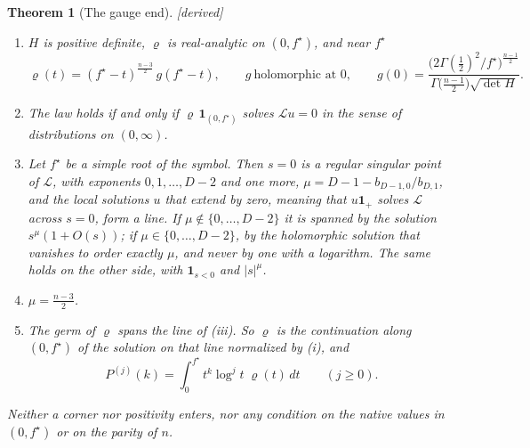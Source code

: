 \documentclass[11pt]{article}
\newcommand{\one}{\mathbf 1}
\theoremstyle{plain}
\newtheorem{theorem}[proposition]{Theorem}
\theoremstyle{definition}
\theoremstyle{remark}
\newcommand{\derived}{\textup{[derived]}}
\begin{document}
\begin{theorem}[The gauge end]\label{c:t:gauge}\label{d:t:gauge}\derived\
\begin{enumerate}[label=(\roman*)]
\item $H$ is positive definite, $\varrho$ is real-analytic on $(0,f^\star)$, and near $f^\star$
\[
\varrho(t)=(f^\star-t)^{\frac{n-3}2}\,g(f^\star-t),\qquad g\ \text{holomorphic at }0,\qquad g(0)=\frac{\big(2\Gamma(\frac12)^2/f^\star\big)^{\frac{n-1}2}}{\Gamma\big(\frac{n-1}2\big)\sqrt{\det H}} .
\]
\item The law holds if and only if $\varrho\,\one_{(0,f^\star)}$ solves $\mathcal L u=0$ in the sense of distributions on $(0,\infty)$.
\item Let $f^\star$ be a simple root of the symbol. Then $s=0$ is a regular singular point of $\mathcal L$, with exponents $0,1,\dots,D-2$ and one more, $\mu=D-1-b_{D-1,0}/b_{D,1}$, and the local solutions $u$ that \emph{extend by zero}, meaning that $u\one_+$ solves $\mathcal L$ across $s=0$, form a line. If $\mu\notin\{0,\dots,D-2\}$ it is spanned by the solution $s^\mu(1+O(s))$; if $\mu\in\{0,\dots,D-2\}$, by the holomorphic solution that vanishes to order exactly $\mu$, and never by one with a logarithm. The same holds on the other side, with $\one_{s<0}$ and $|s|^\mu$.
\item $\mu=\frac{n-3}2$.
\item The germ of $\varrho$ spans the line of (iii). So $\varrho$ is the continuation along $(0,f^\star)$ of the solution on that line normalized by (i), and
\[
P^{(j)}(k)=\int_0^{f^\star}t^k\log^jt\;\varrho(t)\,dt\qquad(j\ge0).
\]
\end{enumerate}
Neither a corner nor positivity enters, nor any condition on the native values in $(0,f^\star)$ or on the parity of $n$.
\end{theorem}
\end{document}
